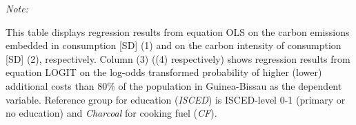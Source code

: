 \begin{table}[htbp!]
\begin{adjustbox}{width = 1\textwidth, max height = 0.95\textheight, center}
\begin{threeparttable}[b]
         \begin{tablenotes}\item \medskip \textit{Note:}
            \item This table displays regression results from equation OLS on the carbon emissions embedded in consumption [SD] (1) and on the carbon intensity of consumption [SD] (2), respectively. 
                                      Column (3) ((4) respectively) shows regression results from equation LOGIT on the log-odds transformed probability of higher (lower) additional costs than 80\% of the population in Guinea-Bissau as the dependent variable. Reference group for education (\textit{ISCED}) is ISCED-level 0-1 (primary or no education) and \textit{Charcoal} for cooking fuel (\textit{CF}).
         \end{tablenotes}
      \end{threeparttable}
   \end{adjustbox}
\end{table}


